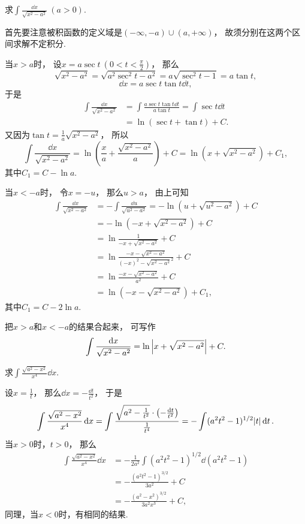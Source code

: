 \begin{example}
求\(\int \frac{\dd{x}}{\sqrt{x^2 - a^2}}\ (a>0)\).
\begin{solution}
首先要注意被积函数的定义域是\((-\infty,-a)\cup(a,+\infty)\)，
故须分别在这两个区间求解不定积分.

当\(x > a\)时，
设\(x = a \sec t\ (0 < t < \frac{\pi}{2})\)，
那么\[
	\sqrt{x^2 - a^2} = \sqrt{a^2 \sec^2 t - a^2} = a \sqrt{\sec^2 t - 1} = a \tan t,
\]\[
	\dd{x} = a \sec t \tan t \dd{t},
\]
于是\begin{align*}
	\int \frac{\dd{x}}{\sqrt{x^2 - a^2}}
	&= \int \frac{a \sec t \tan t \dd{t}}{a \tan t}
	= \int \sec t \dd{t} \\
	&= \ln(\sec t + \tan t) + C.
\end{align*}
又因为\(\tan t = \frac{1}{a} \sqrt{x^2 - a^2}\)，
所以\[
	\int \frac{\dd{x}}{\sqrt{x^2 - a^2}}
	= \ln( \frac{x}{a} + \frac{\sqrt{x^2 - a^2}}{a} ) + C
	= \ln( x + \sqrt{x^2 - a^2} ) + C_1,
\]
其中\(C_1 = C - \ln a\).

当\(x < -a\)时，
令\(x = -u\)，
那么\(u > a\)，
由上可知\begin{align*}
	\int \frac{\dd{x}}{\sqrt{x^2 - a^2}}
	&= -\int \frac{\dd{u}}{\sqrt{u^2 - a^2}}
	= -\ln(u + \sqrt{u^2 - a^2}) + C \\
	&= -\ln(-x + \sqrt{x^2 - a^2}) + C \\
	&= \ln\frac{1}{-x + \sqrt{x^2 - a^2}} + C \\
	&= \ln\frac{-x - \sqrt{x^2 - a^2}}{(-x)^2 - \sqrt{x^2 - a^2}^2} + C \\
	&= \ln\frac{-x - \sqrt{x^2 - a^2}}{a^2} + C \\
	&= \ln(-x - \sqrt{x^2 - a^2}) + C_1,
\end{align*}
其中\(C_1 = C - 2 \ln a\).

把\(x > a\)和\(x < -a\)的结果合起来，
可写作\[
	\int \frac{\dd{x}}{\sqrt{x^2 - a^2}}
	= \ln\abs{x + \sqrt{x^2 - a^2}} + C.
\]
\end{solution}
\end{example}

\begin{example}
求\(\int \frac{\sqrt{a^2 - x^2}}{x^4} \dd{x}\).
\begin{solution}
设\(x = \frac{1}{t}\)，
那么\(\dd{x} = -\frac{\dd{t}}{t^2}\)，
于是\[
	\int \frac{\sqrt{a^2 - x^2}}{x^4} \dd{x}
	= \int \frac{\sqrt{a^2 - \frac{1}{t^2}} \cdot \left( -\frac{\dd{t}}{t^2} \right)}{\frac{1}{t^4}}
	= -\int (a^2 t^2 - 1)^{1/2} \abs{t} \dd{t}.
\]
当\(x > 0\)时，\(t > 0\)，
那么\begin{align*}
	\int \frac{\sqrt{a^2 - x^2}}{x^4} \dd{x}
	&= -\frac{1}{2a^2} \int (a^2 t^2 - 1)^{1/2} \dd(a^2 t^2 - 1) \\
	&= -\frac{(a^2 t^2 - 1)^{3/2}}{3 a^2} + C \\
	&= -\frac{(a^2 - x^2)^{3/2}}{3 a^2 x^3} + C,
\end{align*}
同理，当\(x < 0\)时，有相同的结果.
\end{solution}
\end{example}

